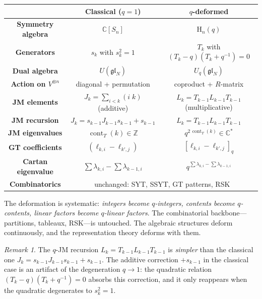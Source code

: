 \documentclass[12pt,a4paper]{article}
\theoremstyle{definition}
\theoremstyle{remark}
\newtheorem{remark}[theorem]{Remark}
\newcommand{\C}{\mathbb{C}}
\newcommand{\Z}{\mathbb{Z}}
\newcommand{\gl}{\mathfrak{gl}}
\newcommand{\cont}{\operatorname{cont}}
\begin{document}
\begin{center}
\renewcommand{\arraystretch}{1.5}
\begin{tabular}{c|c|c}
  & \textbf{Classical ($q = 1$)}
  & \textbf{$q$-deformed} \\
\hline
\textbf{Symmetry algebra}
  & $\C[S_n]$ & $\mathrm{H}_n(q)$ \\
\textbf{Generators}
  & $s_k$ with $s_k^2 = 1$
  & $T_k$ with $(T_k - q)(T_k + q^{-1}) = 0$ \\
\textbf{Dual algebra}
  & $U(\gl_N)$ & $U_q(\gl_N)$ \\
\textbf{Action on $V^{\otimes n}$}
  & diagonal + permutation
  & coproduct + $R$-matrix \\
\textbf{JM elements}
  & $J_k = \textstyle\sum_{i<k} (i\;k)$ (additive)
  & $L_k = T_{k-1} L_{k-1} T_{k-1}$ (multiplicative) \\
\textbf{JM recursion}
  & $J_k = s_{k-1} J_{k-1} s_{k-1} + s_{k-1}$
  & $L_k = T_{k-1} L_{k-1} T_{k-1}$ \\
\textbf{JM eigenvalues}
  & $\cont_T(k) \in \Z$
  & $q^{2\,\cont_T(k)} \in \C^*$ \\
\textbf{GT coefficients}
  & $(\ell_{k,i} - \ell_{k',j})$
  & $[\ell_{k,i} - \ell_{k',j}]_q$ \\
\textbf{Cartan eigenvalue}
  & $\sum \lambda_{k,i} - \sum \lambda_{k-1,i}$
  & $q^{\sum \lambda_{k,i} - \sum \lambda_{k-1,i}}$ \\
\textbf{Combinatorics}
  & \multicolumn{2}{c}{unchanged: SYT, SSYT, GT patterns, RSK}
\end{tabular}
\end{center}

The deformation is systematic: \emph{integers become $q$-integers,
contents become $q$-contents, linear factors become $q$-linear
factors}. The combinatorial backbone---partitions, tableaux, RSK---is
untouched. The algebraic structures deform continuously, and the
representation theory deforms with them.

\begin{remark}
The $q$-JM recursion $L_k = T_{k-1} L_{k-1} T_{k-1}$ is
\emph{simpler} than the classical one
$J_k = s_{k-1} J_{k-1} s_{k-1} + s_{k-1}$. The additive correction
$+s_{k-1}$ in the classical case is an artifact of the degeneration
$q \to 1$: the quadratic relation $(T_k - q)(T_k + q^{-1}) = 0$
absorbs this correction, and it only reappears when the quadratic
degenerates to $s_k^2 = 1$.
\end{remark}
\end{document}
